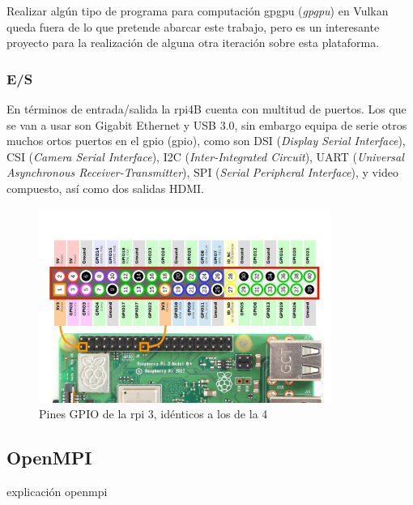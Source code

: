 Realizar algún tipo de programa para computación \acrshort{gpgpu} (\textit{\acrlong{gpgpu}}) en Vulkan queda fuera de lo que pretende abarcar este trabajo, pero es un interesante proyecto para la realización de alguna otra iteración sobre esta plataforma.

\subsubsection{E/S}
En términos de entrada/salida la \acrshort{rpi}4B cuenta con multitud de puertos. Los que se van a usar son Gigabit Ethernet y USB 3.0, sin embargo equipa de serie otros muchos ortos puertos en el \acrshort{gpio} (\acrlong{gpio}), como son DSI (\textit{Display Serial Interface}), CSI (\textit{Camera Serial Interface}), I2C (\textit{Inter-Integrated Circuit}), UART (\textit{Universal Asynchronous Receiver-Transmitter}), SPI (\textit{Serial Peripheral Interface}), y video compuesto, así como dos salidas HDMI.

\begin{figure}[h!]
  \centering
  \includegraphics[width=0.85\textwidth]{img/rpi_parts/rpi_gpio.png}
  \caption{Pines GPIO de la \acrlong{rpi} 3, idénticos a los de la 4}
  \label{fig:rpi_gpio_pinout}
\end{figure}

\subsection{OpenMPI}
explicación openmpi